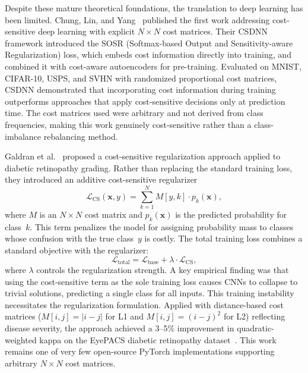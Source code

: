 \documentclass[11pt, letterpaper]{article}
\begin{document}
Despite these mature theoretical foundations, the translation to deep learning
has been limited. Chung, Lin, and Yang~\cite{chung2016csdnn} published the first
work addressing cost-sensitive deep learning with explicit $N \times N$ cost
matrices. Their CSDNN framework introduced the SOSR (Softmax-based Output and
Sensitivity-aware Regularization) loss, which embeds cost information directly
into training, and combined it with cost-aware autoencoders for pre-training.
Evaluated on MNIST, CIFAR-10, USPS, and SVHN with randomized proportional cost
matrices, CSDNN demonstrated that incorporating cost information during training
outperforms approaches that apply cost-sensitive decisions only at prediction
time. The cost matrices used were arbitrary and not derived from class
frequencies, making this work genuinely cost-sensitive rather than a
class-imbalance rebalancing method.

Galdran et al.~\cite{galdran2020} proposed a cost-sensitive regularization
approach applied to diabetic retinopathy grading. Rather than replacing the
standard training loss, they introduced an additive cost-sensitive regularizer
%
\begin{equation}
\label{eq:cs_regularizer}
\mathcal{L}_{\mathrm{CS}}(\mathbf{x}, y) = \sum_{k=1}^{N}
  M[y, k] \cdot p_k(\mathbf{x}),
\end{equation}
%
where $M$ is an $N \times N$ cost matrix and $p_k(\mathbf{x})$ is the predicted
probability for class~$k$. This term penalizes the model for assigning
probability mass to classes whose confusion with the true class~$y$ is costly.
The total training loss combines a standard objective with the regularizer:
%
\begin{equation}
\label{eq:cs_total_loss}
\mathcal{L}_{\mathrm{total}} = \mathcal{L}_{\mathrm{base}}
  + \lambda \cdot \mathcal{L}_{\mathrm{CS}},
\end{equation}
%
where $\lambda$ controls the regularization strength. A key empirical finding
was that using the cost-sensitive term as the sole training loss causes CNNs to
collapse to trivial solutions, predicting a single class for all inputs. This
training instability necessitates the regularization formulation. Applied with
distance-based cost matrices ($M[i,j] = |i - j|$ for L1 and
$M[i,j] = (i-j)^2$ for L2) reflecting disease severity, the approach achieved
a 3--5\% improvement in quadratic-weighted kappa on the EyePACS diabetic
retinopathy dataset~\cite{galdran2020}. This work remains one of very few
open-source PyTorch implementations supporting arbitrary $N \times N$ cost
matrices.
\end{document}
